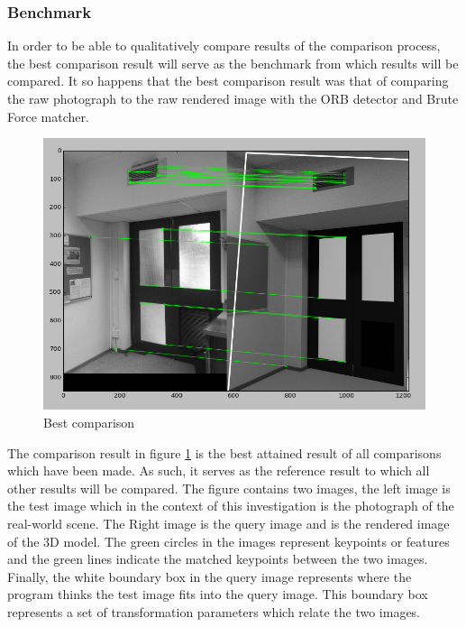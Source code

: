 \documentclass[11pt,a4paper]{report}
\begin{document}
			\subsubsection{Benchmark}
			\label{benchmark}
				In order to be able to qualitatively compare results of the comparison process, the best comparison result will serve as the benchmark from which results will be compared. It so happens that the best comparison result was that of comparing the raw photograph to the raw rendered image with the ORB detector and Brute Force matcher.
				
				\begin{figure}[H]
					\centering
					\includegraphics[width=1\textwidth]{best_comparason}
					\caption{Best comparison}
					\label{fig:best_comparason}
				\end{figure}
				
				The comparison result in figure \ref{fig:best_comparason} is the best attained result of all comparisons which have been made. As such, it serves as the reference result to which all other results will be compared. The figure contains two images, the left image is the test image which in the context of this investigation is the photograph of the real-world scene. The Right image is the query image and is the rendered image of the 3D model. The green circles in the images represent keypoints or features and the green lines indicate the matched keypoints between the two images. Finally, the white boundary box in the query image represents where the program thinks the test image fits into the query image. This boundary box represents a set of transformation parameters which relate the two images.
			
\end{document}
